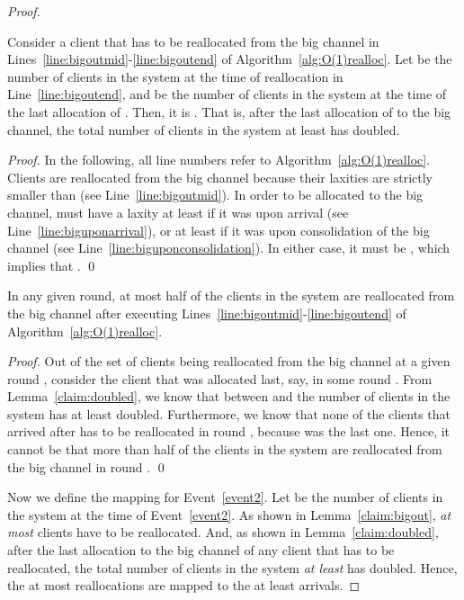 \begin{proof}
\begin{lemma}
\label{claim:doubled}
Consider a client  that has to be reallocated from the big channel in Lines~\ref{line:bigoutmid}-\ref{line:bigoutend} of Algorithm~\ref{alg:O(1)realloc}. 
Let  be the number of clients in the system at the time of reallocation in Line~\ref{line:bigoutend}, and
 be the number of clients in the system at the time of the last allocation of .
Then, it is .
That is, after the last allocation of  to the big channel, the total number of clients in the system at least has doubled.
\end{lemma}
\begin{proof}
In the following, all line numbers refer to Algorithm~\ref{alg:O(1)realloc}.
Clients are reallocated from the big channel because their laxities are strictly smaller than  (see Line~\ref{line:bigoutmid}).
In order to be allocated to the big channel,  must have a laxity at least  if it was upon arrival (see Line~\ref{line:biguponarrival}), or at least  if it was upon consolidation of the big channel (see Line~\ref{line:biguponconsolidation}). In either case, it must be , which implies that .
\qed\end{proof}

\begin{lemma}
\label{claim:bigout}
In any given round, at most half of the clients in the system are reallocated from the big channel after executing Lines~\ref{line:bigoutmid}-\ref{line:bigoutend} of Algorithm~\ref{alg:O(1)realloc}.
\end{lemma}
\begin{proof}
Out of the set of clients being reallocated from the big channel at a given round , consider the client  that was allocated last, say, in some round .
From Lemma~\ref{claim:doubled}, we know that between  and  the number of clients in the system has at least doubled. Furthermore, we know that none of the clients that arrived after  has to be reallocated in round , because  was the last one. Hence, it cannot be that more than half of the clients in the system are reallocated from the big channel in round .
\qed\end{proof}

Now we define the mapping for Event~\ref{event2}. Let  be the number of clients in the system at the time of Event~\ref{event2}. As shown in Lemma~\ref{claim:bigout}, \emph{at most}  clients have to be reallocated. And, as shown in Lemma~\ref{claim:doubled}, after the last allocation to the big channel of any client that has to be reallocated, the total number of clients in the system \emph{at least} has doubled. Hence, the at most  reallocations are mapped to the at least  arrivals.


\end{proof}
